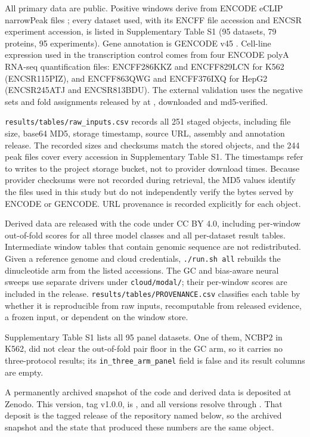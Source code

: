 All primary data are public. Positive windows derive from ENCODE eCLIP narrowPeak files
\citep{encode2012,vannostrand2020}; every dataset used, with its ENCFF file accession and ENCSR
experiment accession, is listed in Supplementary Table S1 (95 datasets, 79 proteins, 95
experiments). Gene annotation is GENCODE v45 \citep{frankish2023}. Cell-line expression used in
the transcription control comes from four ENCODE polyA RNA-seq quantification files:
ENCFF286KKZ and ENCFF829LCN for K562 (ENCSR115PIZ), and ENCFF863QWG and ENCFF376IXQ for HepG2
(ENCSR245ATJ and ENCSR813BDU). The external validation uses the negative sets and fold
assignments released by \citet{horlacher2023} at , downloaded and
md5-verified.

\texttt{results/tables/raw\_inputs.csv} records all 251 staged objects, including file size,
base64 MD5, storage timestamp, source URL, assembly and annotation release. The recorded sizes
and checksums match the stored objects, and the 244 peak files cover every accession in
Supplementary Table S1. The timestamps refer to writes to the project storage bucket, not to
provider download times. Because provider checksums were not recorded during retrieval, the MD5
values identify the files used in this study but do not independently verify the bytes served by
ENCODE or GENCODE. URL provenance is recorded explicitly for each object.

Derived data are released with the code under CC BY 4.0, including per-window out-of-fold scores
for all three model classes and all per-dataset result tables. Intermediate window tables that
contain genomic sequence are not redistributed. Given a reference genome and cloud credentials,
\texttt{./run.sh all} rebuilds the dinucleotide arm from the listed accessions. The GC and
bias-aware neural sweeps use separate drivers under \texttt{cloud/modal/}; their per-window
scores are included in the release. \texttt{results/tables/PROVENANCE.csv} classifies each table
by whether it is reproducible from raw inputs, recomputable from released evidence, a frozen
input, or dependent on the window store.

Supplementary Table S1 lists all 95 panel datasets. One of them, NCBP2 in K562, did not clear
the out-of-fold pair floor in the GC arm, so it carries no three-protocol results; its
\texttt{in\_three\_arm\_panel} field is false and its result columns are empty.

A permanently archived snapshot of the code and derived data is deposited at Zenodo. This
version, tag v1.0.0, is , and all versions resolve through
. That deposit is the tagged release of the repository named
below, so the archived snapshot and the state that produced these numbers are the same
object.
